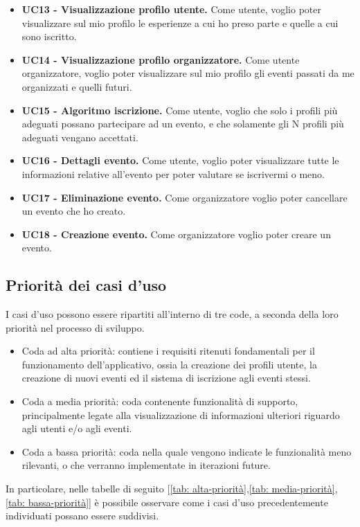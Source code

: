 \begin{itemize}
    \item \textbf{UC13 - Visualizzazione profilo utente.} Come utente, voglio poter visualizzare sul mio profilo le esperienze a cui ho preso parte e quelle a cui sono iscritto.
    \item \textbf{UC14 - Visualizzazione profilo organizzatore.} Come utente organizzatore, voglio poter visualizzare sul mio profilo gli eventi passati da me organizzati e quelli futuri.
    \item \textbf{UC15 - Algoritmo iscrizione.} Come utente, voglio che solo i profili più adeguati possano partecipare ad un evento, e che solamente gli N profili più adeguati vengano accettati.
    \item \textbf{UC16 - Dettagli evento.} Come utente, voglio poter visualizzare tutte le informazioni relative all’evento per poter valutare se iscrivermi o meno.
    \item \textbf{UC17 - Eliminazione evento.} Come organizzatore voglio poter cancellare un evento che ho creato.
    \item \textbf{UC18 - Creazione evento.} Come organizzatore voglio poter creare un evento.
\end{itemize}
\clearpage

\subsection{Priorità dei casi d'uso}

I casi d'uso possono essere ripartiti all'interno di tre code, a seconda della loro priorità nel processo di sviluppo.
\begin{itemize}
    \item Coda ad alta priorità: contiene i requisiti ritenuti fondamentali per il funzionamento dell'applicativo, ossia la creazione dei profili utente, la creazione di nuovi eventi ed il sistema di iscrizione agli eventi stessi.
    \item Coda a media priorità: coda contenente funzionalità di supporto, principalmente legate alla visualizzazione di informazioni ulteriori riguardo agli utenti e/o agli eventi.
    \item Coda a bassa priorità: coda nella quale vengono indicate le funzionalità meno rilevanti, o che verranno implementate in iterazioni future.
\end{itemize}

In particolare, nelle tabelle di seguito [\ref*{tab: alta-priorità},\ref*{tab: media-priorità},\ref*{tab: bassa-priorità}] 
è possibile osservare come i casi d'uso precedentemente individuati possano essere suddivisi.
\clearpage

